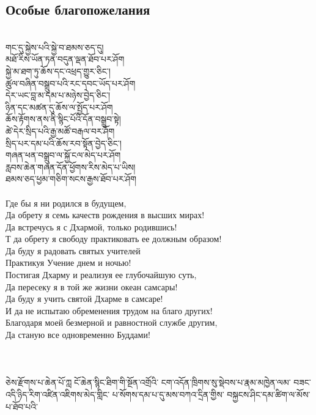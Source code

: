 \subsection{Особые благопожелания}
\\
\ti
གང་དུ་སྐྱེས་པའི་སྐྱེ་བ་ཐམས་ཅད་དུ།\\
མཐོ་རིས་ཡོན་ཏན་བདུན་ལྡན་ཐོབ་པར་ཤོག\\
སྐྱེ་མ་ཐག་ཏུ་ཆོས་དང་འཕྲད་གྱུར་ཅིང༌།\\
ཚུལ་བཞིན་བསྒྲུབ་པའི་རང་དབང་ཡོད་པར་ཤོག\\
དེར་ཡང་བླ་མ་དམ་པ་མཉེས་བྱེད་ཅིང༌། \\
ཉིན་དང་མཚན་དུ་ཆོས་ལ་སྤྱོད་པར་ཤོག\\
ཆོས་རྟོགས་ནས་ནི་སྙིང་པོའི་དོན་བསྒྲུབ་སྟེ།\\
ཚེ་དེར་སྲིད་པའི་རྒྱ་མཚོ་བརྒལ་བར་ཤོག \\
སྲིད་པར་དམ་པའི་ཆོས་རབ་སྟོན་བྱེད་ཅིང༌།\\
གཞན་ཕན་བསྒྲུབ་ལ་སྐྱོ་ངལ་མེད་པར་ཤོག\\
རླབས་ཆེན་གཞན་དོན་ཕྱོགས་རིས་མེད་པ་ཡིས།\\
ཐམས་ཅད་ཕྱམ་གཅིག་སངས་རྒྱས་ཐོབ་པར་ཤོག\\
\\
\ru Где бы я ни родился в будущем,\\
Да обрету я семь качеств рождения в высших мирах!\\
Да встречусь я с Дхармой, только родившись!\\
Т да обрету я свободу практиковать ее должным образом!\\
Да буду я радовать святых учителей\\
Практикуя Учение днем и ночью!\\
Постигая Дхарму и реализуя ее глубочайшую суть,\\
Да пересеку я в той же жизни океан самсары!\\
Да буду я учить святой Дхарме в самсаре!\\
И да не испытаю обременения трудом на благо других!\\
Благодаря моей безмерной и равностной службе другим,\\
Да станую все одновременно Буддами!\\
\\
\\
\\
\newpage
\ti\scriptsize ཅེས་རྫོགས་པ་ཆེན་པོ་ཀླ
ོང་ཆེན་སྙིང་ཐིག་གི་སྔོན་འགྲོའི་
ངག་འདོན་ཁྲིགས་སུ་སྡེབས་པ་རྣམ་མཁྱེན་ལམ་
བཟང་འདི་ཉིད་རིག་འཛིན་འཇིགས་མེད་གླིང་
པ་སོགས་དམ་པ་དུ་མས་བཀའ་དྲིན་གྱིས་
བསྐྱངས་ཤིང་དམ་ཚིག་ལ་མོས་པ་ཐོབ་པའི་
